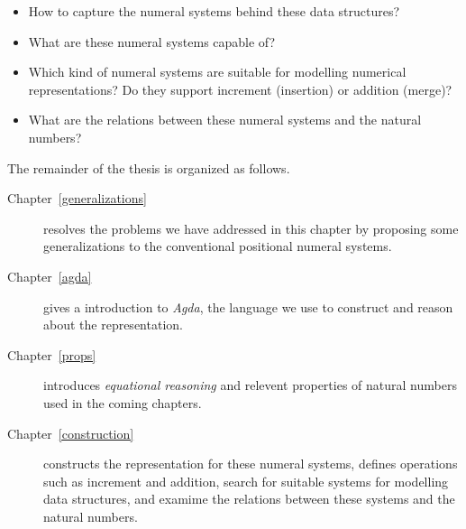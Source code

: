 \documentclass[\main/thesis.tex]{subfiles}
\begin{document}
\begin{itemize}
    \item How to capture the numeral systems behind these data structures?
    \item What are these numeral systems capable of?
    \item Which kind of numeral systems are suitable for modelling numerical
        representations? Do they support increment (insertion) or addition (merge)?
    \item What are the relations between these numeral systems and the natural numbers?
\end{itemize}

The remainder of the thesis is organized as follows.

\begin{description}
    \item[Chapter~\ref{generalizations}]
        resolves the problems we have addressed in this chapter by proposing
        some generalizations to the conventional positional numeral systems.
   \item[Chapter~\ref{agda}]
        gives a introduction to \textit{Agda}, the language we use to construct
        and reason about the representation.
   \item[Chapter~\ref{props}]
        introduces \textit{equational reasoning} and relevent properties
        of natural numbers used in the coming chapters.
   \item[Chapter~\ref{construction}] constructs the representation for these
        numeral systems, defines operations such as increment and addition,
        search for suitable systems for modelling data structures,
        and examime the relations between these systems and the natural numbers.
\end{description}


%
%
\end{document}
